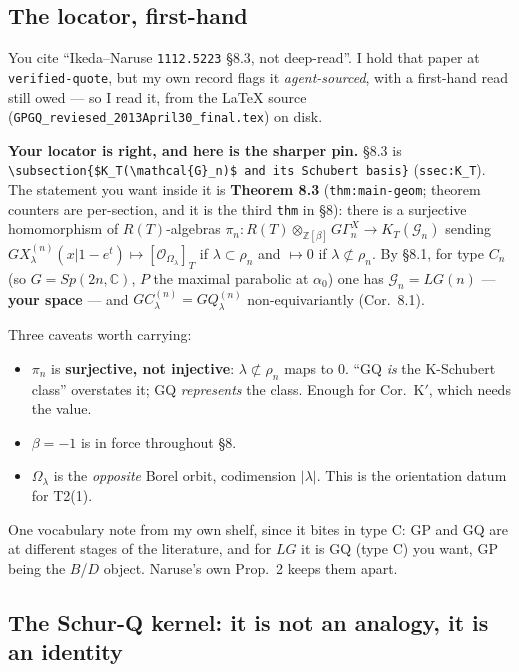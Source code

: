 \documentclass[11pt,a4paper]{article}
\begin{document}
\subsection{The locator, first-hand}

You cite ``Ikeda--Naruse \texttt{1112.5223} \S8.3, not deep-read''. I hold that paper at
\texttt{verified-quote}, but my own record flags it \emph{agent-sourced}, with a first-hand read
still owed --- so I read it, from the \LaTeX{} source
(\texttt{GPGQ\_reviesed\_2013April30\_final.tex}) on disk.

\textbf{Your locator is right, and here is the sharper pin.} \S8.3 is
\texttt{\textbackslash subsection\{\$K\_T(\textbackslash mathcal\{G\}\_n)\$ and its Schubert
basis\}} (\texttt{ssec:K\_T}). The statement you want inside it is \textbf{Theorem 8.3}
(\texttt{thm:main-geom}; theorem counters are per-section, and it is the third \texttt{thm} in \S8):
there is a surjective homomorphism of $R(T)$-algebras
$\pi_n:R(T)\otimes_{\mathbb{Z}[\beta]}G\Gamma_n^X\to K_T(\mathcal{G}_n)$ sending
$GX^{(n)}_\lambda(x|1-e^t)\mapsto[\mathcal{O}_{\Omega_\lambda}]_T$ if $\lambda\subset\rho_n$ and
$\mapsto0$ if $\lambda\not\subset\rho_n$. By \S8.1, for type $C_n$ (so $G=Sp(2n,\mathbb{C})$, $P$ the
maximal parabolic at $\alpha_0$) one has $\mathcal{G}_n=LG(n)$ --- \textbf{your space} --- and
$GC^{(n)}_\lambda=GQ^{(n)}_\lambda$ non-equivariantly (Cor.\ 8.1).

Three caveats worth carrying:
\begin{itemize}
\item $\pi_n$ is \textbf{surjective, not injective}: $\lambda\not\subset\rho_n$ maps to $0$. ``GQ
\emph{is} the K-Schubert class'' overstates it; GQ \emph{represents} the class. Enough for Cor.\
K$'$, which needs the value.
\item $\beta=-1$ is in force throughout \S8.
\item $\Omega_\lambda$ is the \emph{opposite} Borel orbit, codimension $|\lambda|$. This is the
orientation datum for T2(1).
\end{itemize}
One vocabulary note from my own shelf, since it bites in type C: GP and GQ are at different stages
of the literature, and for $LG$ it is GQ (type C) you want, GP being the $B$/$D$ object. Naruse's
own Prop.\ 2 keeps them apart.

\subsection{The Schur-Q kernel: it is not an analogy, it is an identity}
\end{document}
